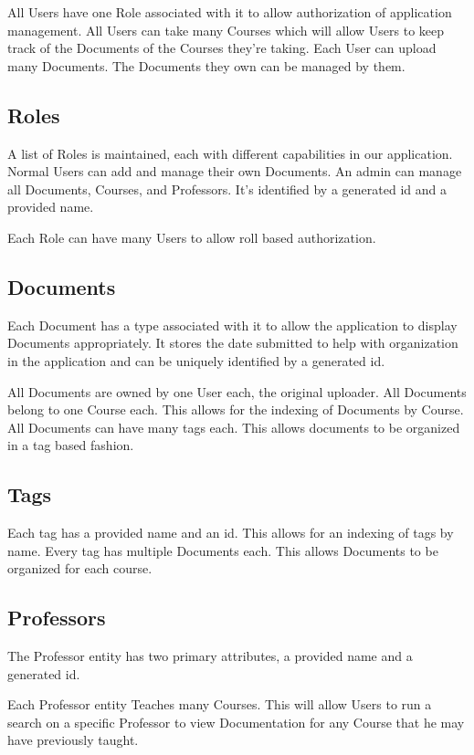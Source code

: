 \documentclass[11pt]{article}
\begin{document}
   All Users have one Role associated with it to allow authorization
   of application management.  All Users can take many Courses which
   will allow Users to keep track of the Documents of the Courses
   they're taking. Each User can upload many Documents. The Documents
   they own can be managed by them.
\subsection{Roles}
\label{sec-2-2}


   A list of Roles is maintained, each with different capabilities in
   our application.  Normal Users can add and manage their own
   Documents. An admin can manage all Documents, Courses, and
   Professors.  It's identified by a generated id and a provided name.

   Each Role can have many Users to allow roll based authorization.
\subsection{Documents}
\label{sec-2-3}


   Each Document has a type associated with it to allow the
   application to display Documents appropriately. It stores the date
   submitted to help with organization in the application and can be
   uniquely identified by a generated id.

   All Documents are owned by one User each, the original
   uploader. All Documents belong to one Course each. This allows for
   the indexing of Documents by Course. All Documents can have many
   tags each. This allows documents to be organized in a tag based
   fashion.
\subsection{Tags}
\label{sec-2-4}


   Each tag has a provided name and an id. This allows for an indexing
   of tags by name.  Every tag has multiple Documents each. This
   allows Documents to be organized for each course.
\subsection{Professors}
\label{sec-2-5}


   The Professor entity has two primary attributes, a provided name
   and a generated id.
   
   Each Professor entity Teaches many Courses. This will allow Users
   to run a search on a specific Professor to view Documentation for
   any Course that he may have previously taught.
\end{document}
